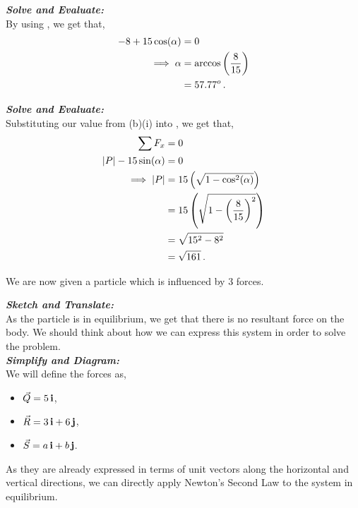 \begin{subquestions}
\begin{subsubquestions}
\textbf{\textit{Solve and Evaluate:}} \\
By using , we get that,
\begin{align}
	-8 + 15\cos(\alpha) & = 0 \nonumber \\
	\implies \alpha & = \arccos\left(\frac{8}{15}\right) \nonumber \\
	                & = 57.77^o \,. 
\end{align}


\subsubquestion

\textbf{\textit{Solve and Evaluate:}} \\
Substituting our value from (b)(i) into , we get that,
\begin{align}
	\sum F_x & = 0 \nonumber \\
	|P| - 15\sin(\alpha) & = 0 \nonumber \\ 
	\implies |P| & = 15\left(\sqrt{1-\cos^2(\alpha)} \right) \nonumber \\
	             & = 15\left(\sqrt{1-\left(\frac{8}{15}\right)^2} \right) \nonumber \\
	             & = \sqrt{15^2-8^2} \nonumber \\
	             & = \sqrt{161} \,.
\end{align}
	
\end{subsubquestions}


\subquestion
We are now given a particle which is influenced by 3 forces.
\begin{subsubquestions}

\subsubquestion

\textbf{\textit{Sketch and Translate:}} \\
As the particle is in equilibrium, we get that there is no resultant force on the body. We should think about how we can express this system in order to solve the problem.\\




\textbf{\textit{Simplify and Diagram:}} \\
We will define the forces as,
\begin{itemize}
	\item $\vec{Q}=5\,\mathbf{i}$,
	\item $\vec{R}=3\,\mathbf{i}+6\,\mathbf{j}$,
	\item $\vec{S}=a\,\mathbf{i}+b\,\mathbf{j}$.
\end{itemize}
As they are already expressed in terms of unit vectors along the horizontal and vertical directions, we can directly apply Newton's Second Law to the system in equilibrium.\\





\end{subsubquestions}
\end{subquestions}
